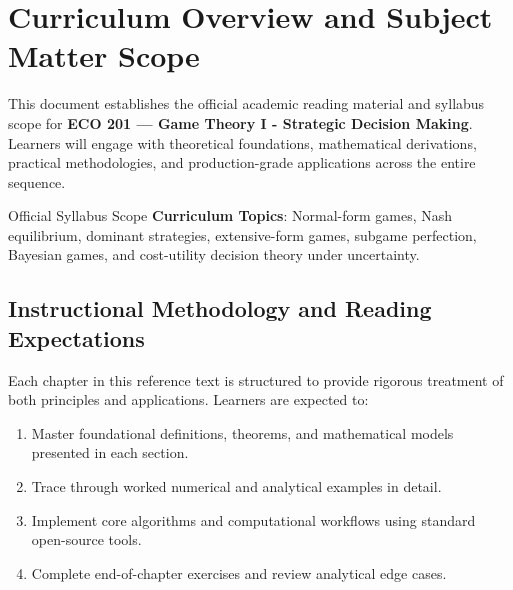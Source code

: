 \section{Curriculum Overview and Subject Matter Scope}

This document establishes the official academic reading material and syllabus scope for \textbf{ECO 201 --- Game Theory I - Strategic Decision Making}. Learners will engage with theoretical foundations, mathematical derivations, practical methodologies, and production-grade applications across the entire sequence.

\begin{InsightBox}{Official Syllabus Scope}
  \textbf{Curriculum Topics}: Normal-form games, Nash equilibrium, dominant strategies, extensive-form games, subgame perfection, Bayesian games, and cost-utility decision theory under uncertainty.
\end{InsightBox}

\subsection{Instructional Methodology and Reading Expectations}

Each chapter in this reference text is structured to provide rigorous treatment of both principles and applications. Learners are expected to:
\begin{enumerate}
  \item Master foundational definitions, theorems, and mathematical models presented in each section.
  \item Trace through worked numerical and analytical examples in detail.
  \item Implement core algorithms and computational workflows using standard open-source tools.
  \item Complete end-of-chapter exercises and review analytical edge cases.
\end{enumerate}

